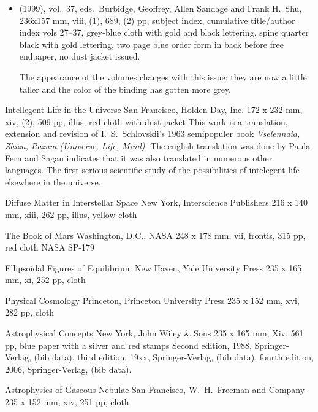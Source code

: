 \begin{itemize}
	\item (1999), vol.\ 37, eds.\ Burbidge, Geoffrey, Allen Sandage and Frank H.\ Shu, 236x157 mm,
	viii, (1), 689, (2) pp, subject index, cumulative title/author index vols 27--37,
	grey-blue cloth with gold and black lettering, spine quarter black with gold lettering,
	two page blue order form in back before free endpaper, no dust jacket	issued.
	
	The appearance of the volumes changes with this issue; they are now a little taller
	and the color of the binding has gotten more grey.
	
\end{itemize}


{Intellegent Life in the Universe}
{San Francisco, Holden-Day, Inc.}
{172 x 232 mm, xiv, (2), 509 pp, illus, red cloth with dust jacket}
{}
This work is a translation, extension and revision of I.\ S.\ Schlovskii's
1963 semipopuler book {\it Vselennaia, Zhizn, Razum (Universe, Life, Mind)}.
The english translation was done by Paula Fern and Sagan indicates that it
was also translated in numerous other languages.  The first serious scientific study 
of the possibilities of intelegent life elsewhere in the universe.

{Diffuse Matter in Interstellar Space}
{New York, Interscience Publishers}
{216 x 140 mm, xiii, 262 pp, illus, yellow cloth}
{}

{The Book of Mars}
{Washington, D.C., NASA}
{248 x 178 mm, vii, frontis, 315 pp, red cloth}
{}
NASA SP-179

{Ellipsoidal Figures of Equilibrium}
{New Haven, Yale University Press}
{235 x 165 mm, xi, 252 pp, cloth}
{}

{Physical Cosmology}
{Princeton, Princeton University Press}
{235 x 152 mm, xvi, 282 pp, cloth}
{}

{Astrophysical Concepts}
{New York, John Wiley \& Sons}
{235 x 165 mm, Xiv, 561 pp, blue paper with a silver and red stamps}
{}
Second edition, 1988, Springer-Verlag, (bib data),
third edition, 19xx, Springer-Verlag, (bib data),
fourth edition, 2006, Springer-Verlag, (bib data).


{Astrophysics of Gaseous Nebulae}
{San Francisco, W.\ H.\ Freeman and Company}
{235 x 152 mm, xiv, 251 pp, cloth}
{}

